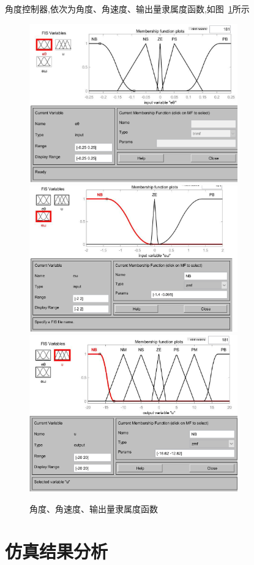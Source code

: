 角度控制器,依次为角度、角速度、输出量隶属度函数,如图~\ref{Fig:a}所示

\begin{figure}[hbpt]
\centering
\includegraphics[width=9cm]{a1.png}
\includegraphics[width=9cm]{a2.png}
\includegraphics[width=9cm]{a3.png}
\caption{角度、角速度、输出量隶属度函数}\label{Fig:a}
\end{figure}

\section{仿真结果分析}
